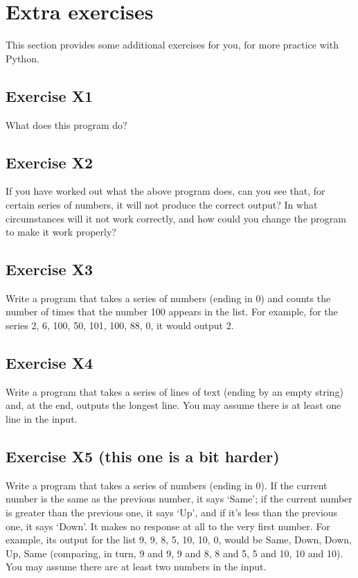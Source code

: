 \section{Extra exercises}
\label{sec:additional-exercises}

This section provides some additional exercises for you, for more
practice with Python.  

\subsection*{Exercise X1}

What does this program do?


\subsection*{Exercise X2}

If you have worked out what the above program does, can you
see that, for certain series of numbers, it will not produce the correct
output?  In what circumstances will it not work correctly, and how could
you change the program to make it work properly?

\subsection*{Exercise X3}

Write a program that takes a series of numbers (ending in 0) and counts
the number of times that the number 100 appears in the list.  For example,
for the series 2, 6, 100, 50, 101, 100, 88, 0, it would output 2.

\subsection*{Exercise X4}

Write a program that takes a series of lines of text (ending by 
an empty string) and,
at the end, outputs the longest line.
You may assume there is at least one line in the input.

\pagebreak


\subsection*{Exercise X5 (this one is a bit harder)}

Write a program that takes
a series of numbers (ending in 0).  If the
current number is the same as the previous number, it says `Same';
if the current number is greater than the previous one, it says `Up',
and if it's less than the previous one, it says `Down'.
It makes no response at all to the
very first number.  For example, its output for the list 9, 9, 8, 5,
10, 10, 0,
would be Same, Down, Down, Up, Same
(comparing, in turn, 9 and 9, 9 and 8, 8 and 5, 5 and 10, 10 and 10).
You may assume there are at least two numbers in the input.

